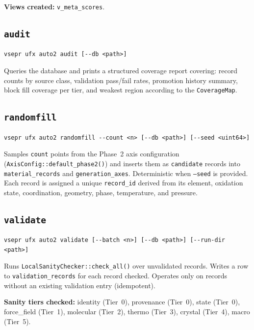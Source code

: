 \documentclass[11pt,letterpaper]{article}
\begin{document}
\textbf{Views created:} \texttt{v\_meta\_scores}.

\subsection{\texttt{audit}}

\begin{lstlisting}
vsepr ufx auto2 audit [--db <path>]
\end{lstlisting}

Queries the database and prints a structured coverage report covering:
record counts by source class, validation pass/fail rates, promotion
history summary, block fill coverage per tier, and weakest region
according to the \texttt{CoverageMap}.

\subsection{\texttt{randomfill}}

\begin{lstlisting}
vsepr ufx auto2 randomfill --count <n> [--db <path>] [--seed <uint64>]
\end{lstlisting}

Samples \texttt{count} points from the Phase~2 axis configuration
(\texttt{AxisConfig::default\_phase2()}) and inserts them as
\texttt{candidate} records into \texttt{material\_records} and
\texttt{generation\_axes}.  Deterministic when \texttt{--seed} is
provided.  Each record is assigned a unique \texttt{record\_id} derived
from its element, oxidation state, coordination, geometry, phase,
temperature, and pressure.

\subsection{\texttt{validate}}

\begin{lstlisting}
vsepr ufx auto2 validate [--batch <n>] [--db <path>] [--run-dir <path>]
\end{lstlisting}

Runs \texttt{LocalSanityChecker::check\_all()} over unvalidated records.
Writes a row to \texttt{validation\_records} for each record checked.
Operates only on records without an existing validation entry (idempotent).

\textbf{Sanity tiers checked:}
identity (Tier~0), provenance (Tier~0), state (Tier~0), force\_field
(Tier~1), molecular (Tier~2), thermo (Tier~3), crystal (Tier~4),
macro (Tier~5).
\end{document}

